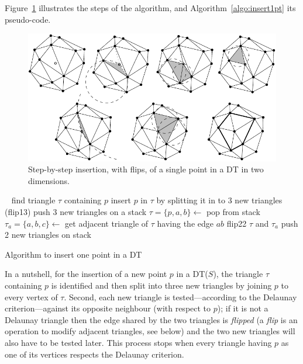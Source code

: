 Figure~\ref{fig:insertion_steps} illustrates the steps of the algorithm, and Algorithm~\ref{algo:insert1pt} its pseudo-code. 
\begin{figure}
  \centering
  \includegraphics[width=\textwidth]{figs/insertion_steps}
  \caption{Step-by-step insertion, with flips, of a single point in a DT in two dimensions.}%
\label{fig:insertion_steps}
\end{figure}
\begin{algorithm}[tb] 
  \DontPrintSemicolon\
  find triangle $\tau$ containing $p$\;
  insert $p$ in $\tau$ by splitting it in to 3 new triangles (flip13)\;
  push 3 new triangles on a stack\;
  {
    $\tau = \{p,a,b\} \leftarrow$ pop from stack\;
    $\tau_{a} = \{a,b,c\} \leftarrow$ get adjacent triangle of $\tau$ having the edge $ab$\;
    \If{$c$ is inside circumcircle of $\tau$}
    {
      flip22 $\tau$ and $\tau_{a}$\;
      push 2 new triangles on stack\;
    }
  }
  \caption{Algorithm to insert one point in a DT}%
\label{algo:insert1pt}
\end{algorithm} 
In a nutshell, for the insertion of a new point $p$ in a DT($S$), the triangle $\tau$ containing $p$ is identified and then split into three new triangles by joining $p$ to every vertex of $\tau$. 
Second, each new triangle is tested---according to the Delaunay criterion---against its opposite neighbour (with respect to $p$); if it is not a Delaunay triangle then the edge shared by the two triangles is \emph{flipped} (a \emph{flip} is an operation to modify adjacent triangles, see below) and the two new triangles will also have to be tested later. 
This process stops when every triangle having $p$ as one of its vertices respects the Delaunay criterion.


